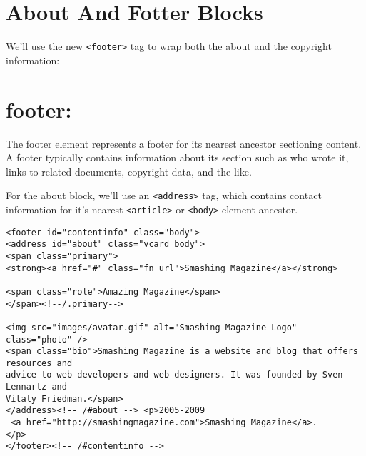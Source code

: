 \documentclass[a4paper, 12pt]{book}
\begin{document}
\section{About And Fotter Blocks}
We'll use the new \verb|<footer>| tag to wrap both the about and the copyright
information:
\section{footer:} The footer element represents a footer for its nearest
ancestor sectioning content. A footer typically contains information about its
section such as who wrote it, links to related documents, copyright data, and
the like.

For the about block, we'll use an \verb|<address>| tag, which contains contact
information for it's nearest \verb|<article>| or \verb|<body>| element ancestor.
\begin{verbatim}
<footer id="contentinfo" class="body">
<address id="about" class="vcard body">
<span class="primary">
<strong><a href="#" class="fn url">Smashing Magazine</a></strong>

<span class="role">Amazing Magazine</span>
</span><!--/.primary-->

<img src="images/avatar.gif" alt="Smashing Magazine Logo" class="photo" />
<span class="bio">Smashing Magazine is a website and blog that offers resources and
advice to web developers and web designers. It was founded by Sven Lennartz and
Vitaly Friedman.</span>
</address><!-- /#about --> <p>2005-2009
 <a href="http://smashingmagazine.com">Smashing Magazine</a>.
</p>
</footer><!-- /#contentinfo -->
\end{verbatim}
\end{document}
